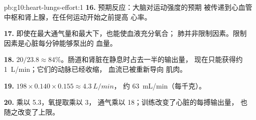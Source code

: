 \begin{solution}{pb:g10:heart-lungs-effort:1}
\textbf{16.} 预期反应：大脑对运动强度的预期
被传递到心血管中枢和肾上腺，在任何运动开始之前提高
心率。

\textbf{17.} 即使在最大通气量和最大下，也能使血液充分氧合；
肺并非限制因素。限制因素是心脏每分钟能够泵出的
血量。

\textbf{18.} $20/23.8 \approx 84\%$。肠道和肾脏在静息时占去一半的输出量，
现在只能获得约 \qty{1}{L/min}；它们的动脉已经收缩，
血流已被重新导向
肌肉。

\textbf{19.} $198 \times 0.140 \times 0.155 \approx \qty{4.3}{L/min}$，
约 \qty{63}{mL/min}（每千克）。

\textbf{20.} 乘以 5.3，氧提取乘以 3，
通气乘以 18；训练改变了心脏的每搏输出量，
也随之改变了上限。
\end{solution}
